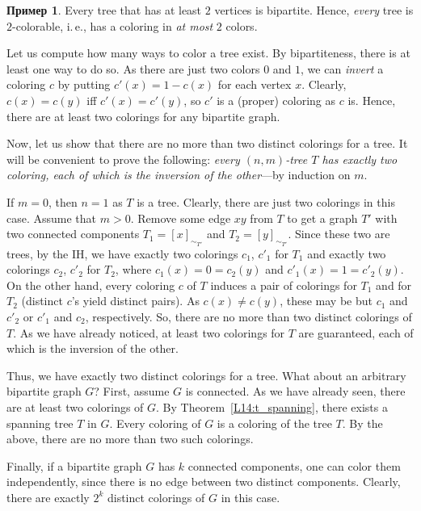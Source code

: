 \documentclass[12pt,notitlepage]{article}
\theoremstyle{plain}
\theoremstyle{definition}
\newtheorem{exm}[thm]{Пример}
\theoremstyle{plain}
\newcommand{\1}{\mathbf{1}}
\newcommand{\0}{\mathbf{0}}
\begin{document}
\begin{exm}
	Every tree that has at least $2$ vertices is bipartite. Hence, \emph{every} tree is $2$-colorable, i.\,e., has a coloring in \emph{at most} $2$ colors.
	
	Let us compute how many ways to color a tree exist. By bipartiteness, there is at least one way to do so. As there are just two colors $0$ and $1$, we can \emph{invert} a coloring $c$ by putting $c'(x) = 1 - c(x)$ for each vertex $x$. Clearly, $c(x) = c(y)$ iff $c'(x) = c'(y)$, so $c'$ is a (proper) coloring as $c$ is. Hence, there are at least two colorings for any bipartite graph.
	
	Now, let us show that there are no more than two distinct colorings for a tree. It will be convenient to prove the following: \emph{every $(n,m)$-tree $T$ has exactly two coloring, each of which is the inversion of the other}---by induction on $m$.
	
	If $m = 0$, then $n = 1$ as $T$ is a tree. Clearly, there are just two colorings in this case. Assume that $m > 0$. Remove some edge $x y$ from $T$ to get a graph $T'$ with two connected components $T_1 = [x]_{\sim_{T'}}$ and $T_2 = [y]_{\sim_{T'}}$. Since these two are trees, by the IH, we have exactly two colorings $c_1$, $c'_1$ for $T_1$ and exactly two colorings $c_2$, $c'_2$ for $T_2$, where $c_1(x) = 0 = c_2(y)$ and $c'_1(x) = 1 = c'_2(y)$. On the other hand, every coloring $c$ of $T$ induces a pair of colorings for $T_1$ and for $T_2$ (distinct $c$'s yield distinct pairs). As $c(x) \neq c(y)$, these may be but $c_1$ and $c'_2$ or $c'_1$ and $c_2$, respectively. So, there are no more than two distinct colorings of $T$. As we have already noticed, at least two colorings for $T$ are guaranteed, each of which is the inversion of the other.
	
	Thus, we have exactly two distinct colorings for a tree. What about an arbitrary bipartite graph $G$? First, assume $G$ is connected. As we have already seen, there are at least two colorings of $G$. By Theorem~\ref{L14:t_spanning}, there exists a spanning tree $T$ in $G$. Every coloring of $G$ is a coloring of the tree $T$. By the above, there are no more than two such colorings.
	
	Finally, if a bipartite graph $G$ has $k$ connected components, one can color them independently, since there is no edge between two distinct components. Clearly, there are exactly $2^k$ distinct colorings of $G$ in this case.
\end{exm}
\end{document}
